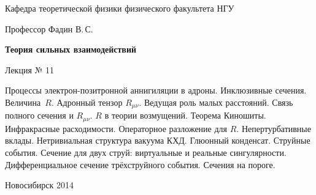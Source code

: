 \documentclass[12pt,pagesize,paper=192mm:108mm]{scrbook}
\begin{document}
\begin{titlepage}
\begin{center}
    Кафедра теоретической физики физического факультета НГУ
    \medskip

    \Large
    Профессор Фадин В.\,С.

    \huge
    \textbf{Теория сильных взаимодействий}
    \smallskip
    
    \Large
    Лекция № 11
    \vfill
    
    \normalsize
    \begin{minipage}{0.9\linewidth}
      Процессы электрон-позитронной аннигиляции в адроны. Инклюзивные
      сечения. Величина~$R$. Адронный тензор $R_{\mu\nu}$. Ведущая
      роль малых расстояний. Связь полного сечения и $R_{\mu\nu}$. $R$
      в теории возмущений. Теорема Киношиты. Инфракрасные
      расходимости. Операторное разложение для $R$. Непертурбативные
      вклады. Нетривиальная структура вакуума КХД. Глюонный
      конденсат. Струйные события. Сечение для двух струй: виртуальные
      и реальные сингулярности. Дифференциальное сечение трёхструйного
      события. Сечения на пороге.
    \end{minipage}
    \vfill
    
    \normalsize \ccbysa\hspace{0.5em} Новосибирск 2014   
  \end{center}
\end{titlepage}
\end{document}
